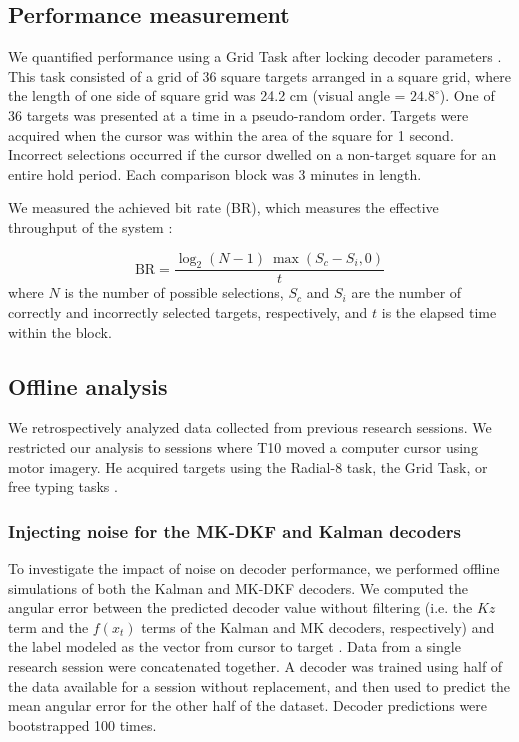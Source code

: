 \subsection{Performance measurement}

We quantified performance using a Grid Task after locking decoder parameters \cite{Brandman2018, Pandarinath2017, Nuyujukian2015}. This task consisted of a grid of 36 square targets arranged in a square grid, where the length of one side of square grid was 24.2 cm (visual angle = $24.8^{\circ}$). One of 36 targets was presented at a time in a pseudo-random order. Targets were acquired when the cursor was within the area of the square for 1 second. Incorrect selections occurred if the cursor dwelled on a non-target square for an entire hold period. Each comparison block was 3 minutes in length. 

We measured the achieved bit rate (BR), which measures the effective throughput of the system \cite{Nuyujukian2015}:

\begin{equation*}
\text{BR} = \frac{\log_2(N - 1) ~ \max(S_c - S_i, 0)}{t}
\end{equation*}
where $N$ is the number of possible selections, $S_c$ and $S_i$ are the number of correctly and incorrectly selected targets, respectively, and $t$ is the elapsed time within the block. 

\subsection{Offline analysis}

We retrospectively analyzed data collected from previous research sessions. We restricted our analysis to sessions where T10 moved a computer cursor using motor imagery. He acquired targets using the Radial-8 task, the Grid Task, or free typing tasks \cite{Jarosiewicz2015}. 

\subsubsection{Injecting noise for the MK-DKF and Kalman decoders}

To investigate the impact of noise on decoder performance, we performed offline simulations of both the Kalman and MK-DKF decoders. We computed the angular error between the predicted decoder value without filtering (i.e. the $Kz$  term and the $f(x_t)$ terms of the Kalman and MK decoders, respectively) and the label modeled as the vector from cursor to target \cite{Simeral2011, Brandman2018}. Data from a single research session were concatenated together. A decoder was trained using half of the data available for a session without replacement, and then used to predict the mean angular error for the other half of the dataset. Decoder predictions were bootstrapped 100 times.  
 
